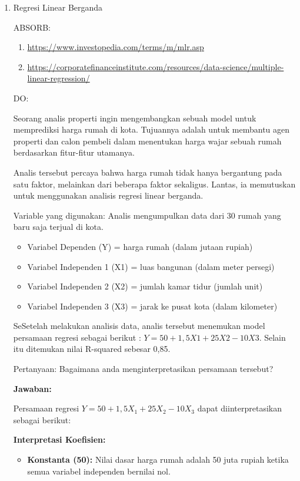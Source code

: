 \documentclass[a4paper]{article}
\begin{document}
\begin{enumerate}[itemsep=1em,leftmargin=*]
\begin{enumerate}
  \end{enumerate}

  \item Regresi Linear Berganda
  
  ABSORB:

  \begin{enumerate}
    \item \url{https://www.investopedia.com/terms/m/mlr.asp}
    \item \url{https://corporatefinanceinstitute.com/resources/data-science/multiple-linear-regression/}
  \end{enumerate}

  DO:

  Seorang analis properti ingin mengembangkan sebuah model untuk memprediksi harga rumah di kota. Tujuannya adalah untuk membantu agen properti dan calon pembeli dalam menentukan harga wajar sebuah rumah berdasarkan fitur-fitur utamanya.

  Analis tersebut percaya bahwa harga rumah tidak hanya bergantung pada satu faktor, melainkan dari beberapa faktor sekaligus. Lantas, ia memutuskan untuk menggunakan analisis regresi linear berganda.

  Variable yang digunakan:
  Analis mengumpulkan data dari 30 rumah yang baru saja terjual di kota.
  \begin{itemize}
    \item Variabel Dependen (Y) = harga rumah (dalam jutaan rupiah)
    \item Variabel Independen 1 (X1) = luas bangunan (dalam meter persegi)
    \item Variabel Independen 2 (X2) = jumlah kamar tidur (jumlah unit)
    \item Variabel Independen 3 (X3) = jarak ke pusat kota (dalam kilometer)
  \end{itemize}

  SeSetelah melakukan analisis data, analis tersebut menemukan model persamaan regresi sebagai berikut : \(Y = 50 + 1,5 X1 + 25 X2 - 10 X3\). Selain itu ditemukan nilai R-squared sebesar 0,85.

  Pertanyaan:
  Bagaimana anda menginterpretasikan persamaan tersebut?
  
  \textbf{Jawaban:}
  
  Persamaan regresi $Y = 50 + 1,5 X_1 + 25 X_2 - 10 X_3$ dapat diinterpretasikan sebagai berikut:
  
  \textbf{Interpretasi Koefisien:}
  \begin{itemize}
    \item \textbf{Konstanta (50):} Nilai dasar harga rumah adalah 50 juta rupiah ketika semua variabel independen bernilai nol.
    

\end{itemize}
\end{enumerate}
\end{document}
